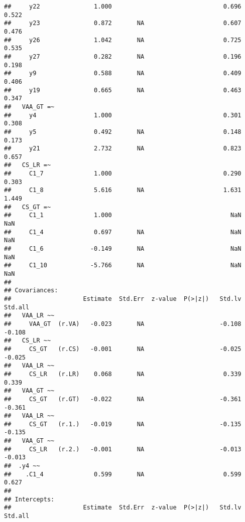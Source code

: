 \documentclass[
]{article}
\begin{document}
\begin{verbatim}
##     y22               1.000                               0.696    0.522
##     y23               0.872       NA                      0.607    0.476
##     y26               1.042       NA                      0.725    0.535
##     y27               0.282       NA                      0.196    0.198
##     y9                0.588       NA                      0.409    0.406
##     y19               0.665       NA                      0.463    0.347
##   VAA_GT =~                                                             
##     y4                1.000                               0.301    0.308
##     y5                0.492       NA                      0.148    0.173
##     y21               2.732       NA                      0.823    0.657
##   CS_LR =~                                                              
##     C1_7              1.000                               0.290    0.303
##     C1_8              5.616       NA                      1.631    1.449
##   CS_GT =~                                                              
##     C1_1              1.000                                 NaN      NaN
##     C1_4              0.697       NA                        NaN      NaN
##     C1_6             -0.149       NA                        NaN      NaN
##     C1_10            -5.766       NA                        NaN      NaN
## 
## Covariances:
##                    Estimate  Std.Err  z-value  P(>|z|)   Std.lv  Std.all
##   VAA_LR ~~                                                             
##     VAA_GT  (r.VA)   -0.023       NA                     -0.108   -0.108
##   CS_LR ~~                                                              
##     CS_GT   (r.CS)   -0.001       NA                     -0.025   -0.025
##   VAA_LR ~~                                                             
##     CS_LR   (r.LR)    0.068       NA                      0.339    0.339
##   VAA_GT ~~                                                             
##     CS_GT   (r.GT)   -0.022       NA                     -0.361   -0.361
##   VAA_LR ~~                                                             
##     CS_GT   (r.1.)   -0.019       NA                     -0.135   -0.135
##   VAA_GT ~~                                                             
##     CS_LR   (r.2.)   -0.001       NA                     -0.013   -0.013
##  .y4 ~~                                                                 
##    .C1_4              0.599       NA                      0.599    0.627
## 
## Intercepts:
##                    Estimate  Std.Err  z-value  P(>|z|)   Std.lv  Std.all

\end{verbatim}
\end{document}
